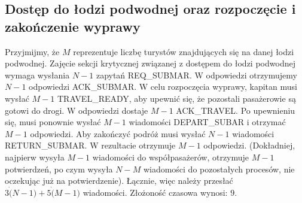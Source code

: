 \documentclass[a4paper]{article}
\begin{document}
\subsection{Dostęp do łodzi podwodnej oraz rozpoczęcie i zakończenie wyprawy}
Przyjmijmy, że $M$ reprezentuje liczbę turystów znajdujących się na danej łodzi podwodnej.
Zajęcie sekcji krytycznej związanej z dostępem do łodzi podwodnej wymaga wysłania $N-1$ zapytań REQ\_SUBMAR. W odpowiedzi otrzymujemy $N-1$ odpowiedzi ACK\_SUBMAR.
W celu rozpoczęcia wyprawy, kapitan musi wysłać $M-1$ TRAVEL\_READY, aby upewnić się, że pozostali pasażerowie są gotowi do drogi. W odpowiedzi dostaje $M-1$ ACK\_TRAVEL.
Po upewnieniu się, musi ponownie wysłać $M-1$ wiadomości DEPART\_SUBAR i otrzymać $M-1$ odpowiedzi.
Aby zakończyć podróż musi wysłać $N-1$ wiadomości RETURN\_SUBMAR. W rezultacie otrzymuje $M-1$ odpowiedzi. (Dokładniej, najpierw wysyła $M-1$ wiadomości do współpasażerów, otrzymuje $M-1$ potwierdzeń, po czym wysyła $N-M$ wiadomości do pozostałych procesów, nie oczekując już na potwierdzenie).
Łącznie, więc należy przesłać $3\dot(N-1) + 5\dot(M-1)$ wiadomości.
Złożoność czasowa wynosi: $9$.


\resetlinenumber[1]\linenumbers
\end{document}
